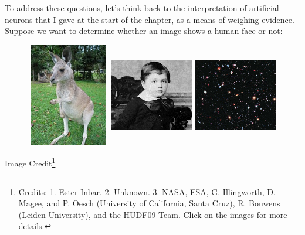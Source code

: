 \documentclass[a4paper,12pt]{report}%
\begin{document}
To address these questions, let's think back to the interpretation of artificial neurons that I gave at the start of the chapter, as a means of weighing evidence. Suppose we want to determine whether an image shows a human face or not:

\begin{figure}[!ht]
\begin{center}
 \includegraphics[width=0.325\textwidth,height=4.5cm]{images/Kangaroo.jpg}
 \includegraphics[width=0.325\textwidth,height=4.5cm]{images/Einstein_crop.jpg}
 \includegraphics[width=0.325\textwidth,height=4.5cm]{images/hubble.jpg}
\end{center}
\end{figure}
Image Credit\footnote{\color{blue} Credits: 1. Ester Inbar. 2. Unknown. 3. NASA, ESA, G. Illingworth, D. Magee, and P. Oesch (University of California, Santa Cruz), R. Bouwens (Leiden University), and the HUDF09 Team. Click on the images for more details.}
\end{document}
